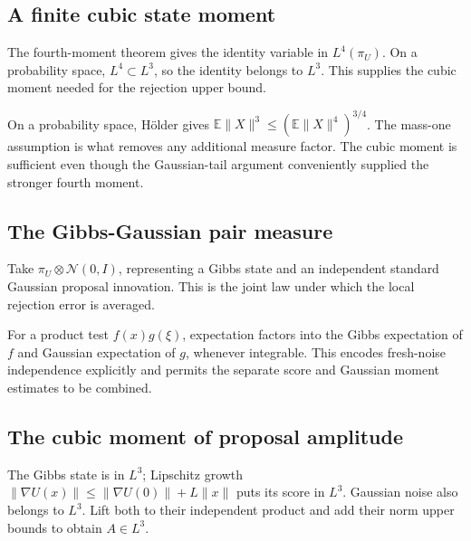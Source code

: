 \documentclass[11pt,a4paper]{report}
\begin{document}
\subsection{\texorpdfstring{A finite cubic state moment}{A finite cubic state moment}}
\label{report-step-UnadjustedLangevin-MALAError-lean-18}


The fourth-moment theorem gives the identity variable in \(L^4(\pi_U)\). On a probability space, \(L^4\subset L^3\), so the identity belongs to \(L^3\). This supplies the cubic moment needed for the rejection upper bound.



On a probability space, Hölder gives \(\mathbb E\|X\|^3\le(\mathbb E\|X\|^4)^{3/4}\). The mass-one assumption is what removes any additional measure factor. The cubic moment is sufficient even though the Gaussian-tail argument conveniently supplied the stronger fourth moment.

\subsection{\texorpdfstring{The Gibbs-Gaussian pair measure}{The Gibbs-Gaussian pair measure}}
\label{report-step-UnadjustedLangevin-MALAError-lean-19}


Take \(\pi_U\otimes\mathcal N(0,I)\), representing a Gibbs state and an independent standard Gaussian proposal innovation. This is the joint law under which the local rejection error is averaged.



For a product test \(f(x)g(\xi)\), expectation factors into the Gibbs expectation of \(f\) and Gaussian expectation of \(g\), whenever integrable. This encodes fresh-noise independence explicitly and permits the separate score and Gaussian moment estimates to be combined.

\subsection{\texorpdfstring{The cubic moment of proposal amplitude}{The cubic moment of proposal amplitude}}
\label{report-step-UnadjustedLangevin-MALAError-lean-20}


The Gibbs state is in \(L^3\); Lipschitz growth \(\|\nabla U(x)\|\le\|\nabla U(0)\|+L\|x\|\) puts its score in \(L^3\). Gaussian noise also belongs to \(L^3\). Lift both to their independent product and add their norm upper bounds to obtain \(A\in L^3\).
\end{document}
